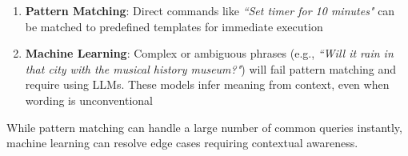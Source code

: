 \begin{enumerate}
    \item \textbf{Pattern Matching}: Direct commands like \textit{``Set timer for 10 minutes"} can be matched to predefined templates for immediate execution
    \item \textbf{Machine Learning}: Complex or ambiguous phrases (e.g., \textit{``Will it rain in that city with the musical history museum?"})
    will fail pattern matching and require using LLMs. These models infer meaning from context, even when wording is unconventional
\end{enumerate}

While pattern matching can handle a large number of common queries instantly, machine learning can resolve edge cases requiring contextual awareness.
